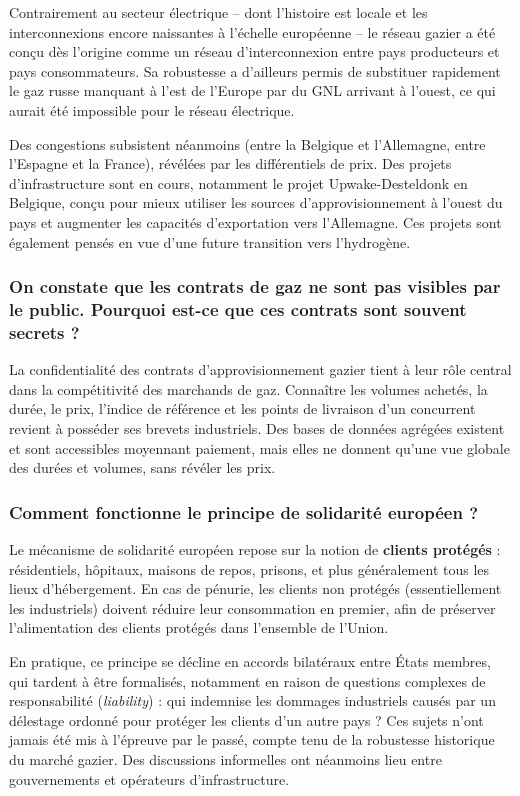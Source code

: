 Contrairement au secteur électrique -- dont l'histoire est locale et les interconnexions encore naissantes à l'échelle européenne -- le réseau gazier a été conçu dès l'origine comme un réseau d'interconnexion entre pays producteurs et pays consommateurs. Sa robustesse a d'ailleurs permis de substituer rapidement le gaz russe manquant à l'est de l'Europe par du GNL arrivant à l'ouest, ce qui aurait été impossible pour le réseau électrique.

Des congestions subsistent néanmoins (entre la Belgique et l'Allemagne, entre l'Espagne et la France), révélées par les différentiels de prix. Des projets d'infrastructure sont en cours, notamment le projet Upwake-Desteldonk en Belgique, conçu pour mieux utiliser les sources d'approvisionnement à l'ouest du pays et augmenter les capacités d'exportation vers l'Allemagne. Ces projets sont également pensés en vue d'une future transition vers l'hydrogène.

\subsubsection{On constate que les contrats de gaz ne sont pas visibles par le public. Pourquoi est-ce que ces contrats sont souvent secrets ?}

La confidentialité des contrats d'approvisionnement gazier tient à leur rôle central dans la compétitivité des marchands de gaz. Connaître les volumes achetés, la durée, le prix, l'indice de référence et les points de livraison d'un concurrent revient à posséder ses brevets industriels. Des bases de données agrégées existent et sont accessibles moyennant paiement, mais elles ne donnent qu'une vue globale des durées et volumes, sans révéler les prix.

\subsubsection{Comment fonctionne le principe de solidarité européen ?}

Le mécanisme de solidarité européen repose sur la notion de \textbf{clients protégés} : résidentiels, hôpitaux, maisons de repos, prisons, et plus généralement tous les lieux d'hébergement. En cas de pénurie, les clients non protégés (essentiellement les industriels) doivent réduire leur consommation en premier, afin de préserver l'alimentation des clients protégés dans l'ensemble de l'Union.

En pratique, ce principe se décline en accords bilatéraux entre États membres, qui tardent à être formalisés, notamment en raison de questions complexes de responsabilité (\textit{liability}) : qui indemnise les dommages industriels causés par un délestage ordonné pour protéger les clients d'un autre pays ? Ces sujets n'ont jamais été mis à l'épreuve par le passé, compte tenu de la robustesse historique du marché gazier. Des discussions informelles ont néanmoins lieu entre gouvernements et opérateurs d'infrastructure.

